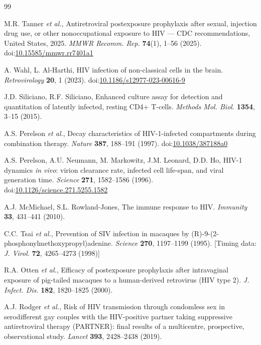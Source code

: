 \documentclass[11pt]{article}
\theoremstyle{definition}
\theoremstyle{remark}
\begin{document}
\begin{thebibliography}{99}

M.R. Tanner \textit{et al.}, Antiretroviral postexposure prophylaxis after sexual, injection drug use, or other nonoccupational exposure to HIV --- CDC recommendations, United States, 2025. \textit{MMWR Recomm. Rep.} \textbf{74}(1), 1--56 (2025). doi:\href{https://doi.org/10.15585/mmwr.rr7401a1}{10.15585/mmwr.rr7401a1}

A. Wahl, L. Al-Harthi, HIV infection of non-classical cells in the brain. \textit{Retrovirology} \textbf{20}, 1 (2023). doi:\href{https://doi.org/10.1186/s12977-023-00616-9}{10.1186/s12977-023-00616-9}

J.D. Siliciano, R.F. Siliciano, Enhanced culture assay for detection and quantitation of latently infected, resting CD4+ T-cells. \textit{Methods Mol. Biol.} \textbf{1354}, 3--15 (2015).

A.S. Perelson \textit{et al.}, Decay characteristics of HIV-1-infected compartments during combination therapy. \textit{Nature} \textbf{387}, 188--191 (1997). doi:\href{https://doi.org/10.1038/387188a0}{10.1038/387188a0}

A.S. Perelson, A.U. Neumann, M. Markowitz, J.M. Leonard, D.D. Ho, HIV-1 dynamics \textit{in vivo}: virion clearance rate, infected cell life-span, and viral generation time. \textit{Science} \textbf{271}, 1582--1586 (1996). doi:\href{https://doi.org/10.1126/science.271.5255.1582}{10.1126/science.271.5255.1582}

A.J. McMichael, S.L. Rowland-Jones, The immune response to HIV. \textit{Immunity} \textbf{33}, 431--441 (2010).

C.C. Tsai \textit{et al.}, Prevention of SIV infection in macaques by (R)-9-(2-phosphonylmethoxypropyl)adenine. \textit{Science} \textbf{270}, 1197--1199 (1995). [Timing data: \textit{J. Virol.} \textbf{72}, 4265--4273 (1998)]

R.A. Otten \textit{et al.}, Efficacy of postexposure prophylaxis after intravaginal exposure of pig-tailed macaques to a human-derived retrovirus (HIV type 2). \textit{J. Infect. Dis.} \textbf{182}, 1820--1825 (2000).

A.J. Rodger \textit{et al.}, Risk of HIV transmission through condomless sex in serodifferent gay couples with the HIV-positive partner taking suppressive antiretroviral therapy (PARTNER): final results of a multicentre, prospective, observational study. \textit{Lancet} \textbf{393}, 2428--2438 (2019).


\end{thebibliography}
\end{document}
